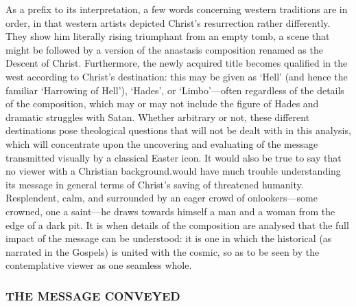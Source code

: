 \documentclass[a4paper,12pt]{article}
\begin{document}
As a prefix to its interpretation, a few words concerning western
traditions are in order, in that western artists depicted Christ’s
resurrection rather differently.  They show him literally rising
triumphant from an empty tomb, a scene that might be followed by a
version of the anastasis composition renamed as the Descent of Christ.
Furthermore, the newly acquired title becomes qualified in the west
according to Christ’s destination: this may be given as ‘Hell’ (and
hence the familiar ‘Harrowing of Hell’), ‘Hades’, or ‘Limbo’---often
regardless of the details of the composition, which may or may not
include the figure of Hades and dramatic struggles with Satan.
Whether arbitrary or not, these different destinations pose
theological questions that will not be dealt with in this analysis,
which will concentrate upon the uncovering and evaluating of the
message transmitted visually by a classical Easter icon.  It would
also be true to say that no viewer with a Christian background.would
have much trouble understanding its message in general terms of
Christ’s saving of threatened humanity.  Resplendent, calm, and
surrounded by an eager crowd of onlookers---some crowned, one a
saint---he draws towards himself a man and a woman from the edge of a
dark pit.  It is when details of the composition are analysed that the
full impact of the message can be understood: it is one in which the
historical (as narrated in the Gospels) is united with the cosmic, so
as to be seen by the contemplative viewer as one seamless whole.

\subsubsection*{THE MESSAGE CONVEYED}
\end{document}

